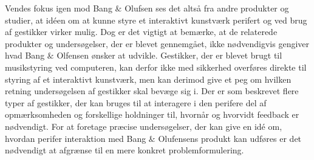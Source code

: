 Vendes fokus igen mod Bang $\&$ Olufsen ses det altså fra andre produkter og studier, at idéen om at kunne styre et interaktivt kunstværk perifert og ved brug af gestikker virker mulig. Dog er det vigtigt at bemærke, at de relaterede produkter og undersøgelser, der er blevet gennemgået, ikke nødvendigvis gengiver hvad Bang $\&$ Olfensen ønsker at udvikle. Gestikker, der er blevet brugt til musikstyring ved computeren, kan derfor ikke med sikkerhed overføres direkte til styring af et interaktivt kunstværk, men kan derimod give et peg om hvilken retning undersøgelsen af gestikker skal bevæge sig i. Der er som beskrevet flere typer af gestikker, der kan bruges til at interagere i den perifere del af opmærksomheden og forskellige holdninger til, hvornår og hvorvidt feedback er nødvendigt. For at foretage præcise undersøgelser, der kan give en idé om, hvordan perifer interaktion med Bang $\&$ Olufensens produkt kan udføres er det nødvendigt at afgrænse til en mere konkret problemformulering.
